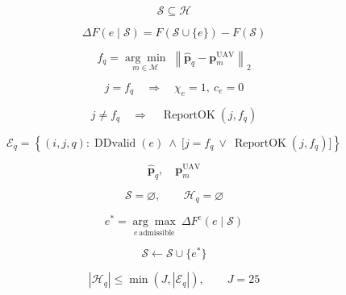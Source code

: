 \documentclass[12pt]{article}
\begin{document}
\begin{equation*}\displaystyle \mathcal S\subseteq\mathcal H\end{equation*}

\begin{equation*}\displaystyle \Delta F(e\mid\mathcal S)=F(\mathcal S\cup\{e\})-F(\mathcal S)\end{equation*}

\begin{equation*}\displaystyle f_q=\underset{m\in\mathcal M}{\arg\min}\;\left\|\widehat{\mathbf p}_q-\mathbf p_m^{\mathrm{UAV}}\right\|_2\end{equation*}

\begin{equation*}\displaystyle j=f_q\quad\Longrightarrow\quad\chi_e=1,\ c_e=0\end{equation*}

\begin{equation*}\displaystyle j\ne f_q\quad\Longrightarrow\quad\operatorname{ReportOK}(j,f_q)\end{equation*}

\begin{equation*}\displaystyle \mathcal E_q=\left\{(i,j,q):\operatorname{DDvalid}(e)\ \land\ \bigl[j=f_q\ \lor\ \operatorname{ReportOK}(j,f_q)\bigr]\right\}\end{equation*}

\begin{equation*}\displaystyle \widehat{\mathbf p}_q,\quad\mathbf p_m^{\mathrm{UAV}}\end{equation*}

\begin{equation*}\displaystyle \mathcal S=\varnothing,\qquad\mathcal H_q=\varnothing\end{equation*}

\begin{equation*}\displaystyle e^*=\underset{e\,\text{admissible}}{\arg\max}\ \Delta F^{\mathrm c}(e\mid\mathcal S)\end{equation*}

\begin{equation*}\displaystyle \mathcal S\leftarrow\mathcal S\cup\{e^*\}\end{equation*}

\begin{equation*}\displaystyle |\mathcal H_q|\le\min(J,|\mathcal E_q|),\qquad J=25\end{equation*}
\end{document}
